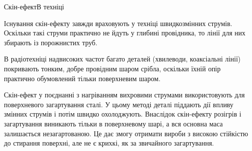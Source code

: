 \documentclass[onlytextwidth]{beamer}
\begin{document}
\begin{frame}{Скін-ефект}{В техніці}\small
	\begin{block}{}\justifying
		Існування скін-ефекту завжди враховують у техніці швидкозмінних струмів. Оскільки такі струми практично не йдуть у глибині провідника, то
		\alert{лінії для них збирають із порожнистих труб}.

		\bigskip


		В радіотехніці надвисоких частот багато деталей (хвилеводи, коаксіальні лінії)
		покривають тонким, добре провідним шаром срібла, оскільки їхній опір практично обумовлений тільки поверхневим шаром.

		\bigskip

		Скін-ефект у поєднанні з нагріванням вихровими струмами \alert{використовують для поверхневого загартування сталі}. У цьому методі деталі
		піддають дії впливу змінних струмів і потім швидко охолоджують. Внаслідок скін-ефекту розігрів і загартування виникають тільки в поверхневому
		шарі, а вся основна маса залишається незагартованою. Це дає змогу отримати вироби з високою стійкістю до стирання поверхні, але не є крихкі, як
		за звичайного загартування.

	\end{block}
\end{frame}
\end{document}

